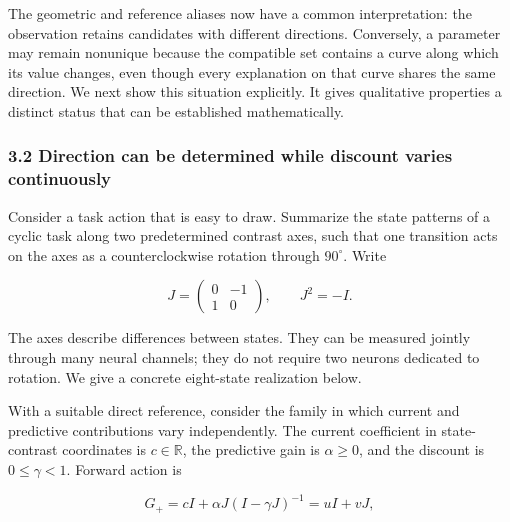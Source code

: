 \documentclass[11pt,a4paper]{article}
\begin{document}
The geometric and reference aliases now have a common interpretation:
the observation retains candidates with different directions.
Conversely, a parameter may remain nonunique because the compatible set
contains a curve along which its value changes, even though every
explanation on that curve shares the same direction. We next show this
situation explicitly. It gives qualitative properties a distinct status
that can be established mathematically.

\subsubsection{3.2 Direction can be determined while discount varies
continuously}\label{direction-can-be-determined-while-discount-varies-continuously}

\par
\noindent\begin{minipage}{\linewidth}

Consider a task action that is easy to draw. Summarize the state
patterns of a cyclic task along two predetermined contrast axes, such
that one transition acts on the axes as a counterclockwise rotation
through \(90^\circ\). Write

\[
J=\begin{pmatrix}0&-1\\1&0\end{pmatrix},\qquad J^2=-I.
\]

\end{minipage}\par

The axes describe differences between states. They can be measured
jointly through many neural channels; they do not require two neurons
dedicated to rotation. We give a concrete eight-state realization below.

\par
\noindent\begin{minipage}{\linewidth}

With a suitable direct reference, consider the family in which current
and predictive contributions vary independently. The current coefficient
in state-contrast coordinates is \(c\in\mathbb R\), the predictive gain
is \(\alpha\geq0\), and the discount is \(0\leq\gamma<1\). Forward
action is

\[
G_+=cI+\alpha J(I-\gamma J)^{-1}=uI+vJ,
\]

\end{minipage}\par
\end{document}
